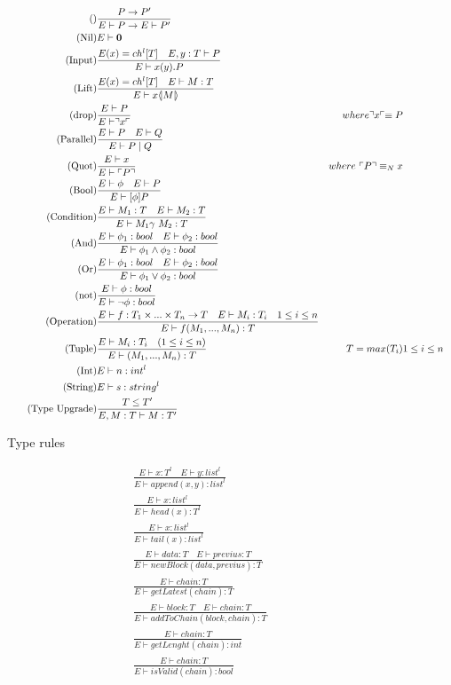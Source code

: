 \begin{figure}
\begin{align}
\tag{} & \frac{P\rightarrow P'}{E\vdash P \rightarrow E\vdash P'}\\
\tag{Nil} &E \vdash \mathbf{0}\\
\tag{Input} &\frac{E(x) = ch^l[T]\quad E,y:T\vdash P}{E \vdash x(y).P}\\
\tag{Lift} &\frac{E(x) = ch^l[T] \quad E \vdash M:T}{E\vdash x \langle \! | M | \! \rangle}\\
\tag{drop} &\frac{E \vdash P}{E\vdash \urcorner x \ulcorner}& where \urcorner x \ulcorner \equiv P\\
\tag{Parallel} &\frac{E\vdash P \quad E \vdash Q}{E \vdash P \mid Q}\\
\tag{Quot} &\frac{E \vdash x}{E\vdash \ulcorner P \urcorner}& where\ \ulcorner P \urcorner \equiv_N x\\
\tag{Bool} &\frac{E\vdash \phi \quad E\vdash P}{E \vdash [\phi] P}\\
\tag{Condition} &\frac{E\vdash M_1:T \quad E\vdash M_2:T}{E\vdash M_1 \gamma\ M_2:T}\\
\tag{And} &\frac{E\vdash \phi _1:bool \quad E\vdash \phi _2:bool}{E\vdash \phi _1 \land \phi _2:bool}\\
\tag{Or} &\frac{E\vdash \phi _1:bool \quad E\vdash \phi _2:bool}{E\vdash \phi _1 \lor \phi _2:bool}\\
\tag{not} &\frac{E\vdash \phi :bool }{E\vdash \neg \phi :bool}\\
\tag{Operation} &\frac{E\vdash f:T_1\times ... \times T_n\rightarrow T\quad E\vdash M_i:T_i\quad 1\leq i \leq n}{E\vdash f(M_1,...,M_n):T}\\
\tag{Tuple} &\frac{E\vdash M_i:T_i \quad (1\leq i\leq n)}{E\vdash (M_1,...,M_n):T}&T = max(T_i)& 1\leq i\leq n\\
\tag{Int} &E\vdash n: int^l\\
\tag{String} &E\vdash s:string^l\\
\tag{Type Upgrade} &\frac{T\leq T'}{E, M:T\vdash M:T'}
\end{align}
\caption{Type rules}
\label{fig:typerules}
\end{figure}

\begin{align}
\tag{Append} &\frac{E \vdash x:T^l \quad E \vdash y:list^l}{E \vdash append(x,y):list^l}\\
\tag{Head} &\frac{E \vdash x:list^l}{E \vdash head(x):T^l}\\
\tag{Tail} &\frac{E \vdash x:list^l}{E \vdash tail(x):list^l}\\
\tag{newBlock}& \frac{E \vdash data:T \quad E \vdash previus : T}{E \vdash newBlock(data, previus) :T}\\
\tag{getLatest}& \frac{E \vdash chain :T}{E \vdash getLatest(chain):T}\\
\tag{addToChain}& \frac{E \vdash block:T \quad E \vdash chain:T}{E \vdash addToChain(block, chain):T}\\
\tag{getLenght}& \frac{E \vdash chain:T}{E \vdash getLenght(chain):int}\\
\tag{isValid}& \frac{E \vdash chain:T}{E \vdash isValid(chain):bool}
\end{align}

